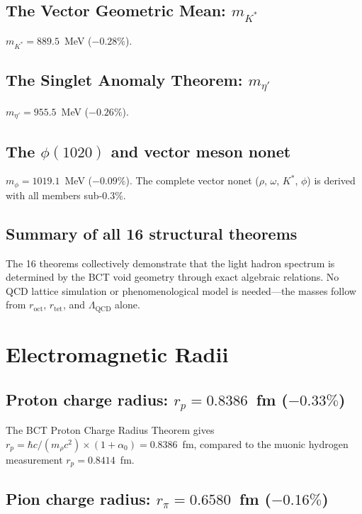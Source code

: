 \documentclass[review,number,sort&compress]{elsarticle}
\newcommand{\roct}{r_{\mathrm{oct}}}
\newcommand{\rtet}{r_{\mathrm{tet}}}
\newcommand{\azero}{\alpha_0}
\newcommand{\LQCD}{\Lambda_{\mathrm{QCD}}}
\begin{document}
\subsection{The Vector Geometric Mean: $m_{K^*}$}

$m_{K^*} = 889.5$~MeV ($-0.28\%$).

\subsection{The Singlet Anomaly Theorem: $m_{\eta'}$}

$m_{\eta'} = 955.5$~MeV ($-0.26\%$).

\subsection{The $\phi(1020)$ and vector meson nonet}

$m_\phi = 1019.1$~MeV ($-0.09\%$). The complete vector nonet
($\rho$, $\omega$, $K^*$, $\phi$) is derived with all members sub-0.3\%.

\subsection{Summary of all 16 structural theorems}

The 16 theorems collectively demonstrate that the light hadron spectrum
is determined by the BCT void geometry through exact algebraic relations.
No QCD lattice simulation or phenomenological model is needed---the
masses follow from $\roct$, $\rtet$, and $\LQCD$ alone.

\section{Electromagnetic Radii}
\label{sec:radii}

\subsection{Proton charge radius: $r_p = 0.8386$~fm ($-0.33\%$)}

The BCT Proton Charge Radius Theorem gives
$r_p = \hbar c/(m_\rho c^2) \times (1 + \azero) = 0.8386$~fm,
compared to the muonic hydrogen measurement $r_p = 0.8414$~fm.

\subsection{Pion charge radius: $r_\pi = 0.6580$~fm ($-0.16\%$)}
\end{document}
